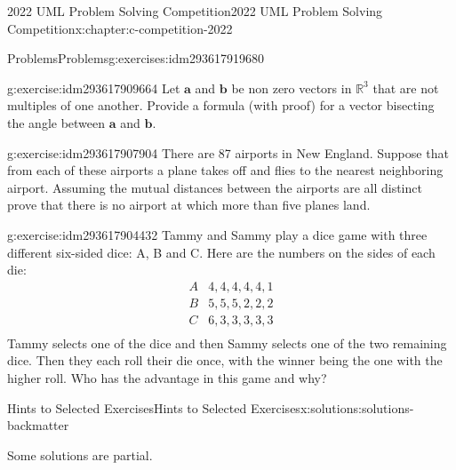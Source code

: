 \documentclass[twoside,10pt,]{book}
\numberwithin{equation}{section}
\providecommand\phantomsection{}
\newcommand{\RR}{\mathbb{R}}
\renewcommand{\vec}[1]{\mathbf{#1}}
\begin{document}
\begin{chapterptx}{2022 UML Problem Solving Competition}{}{2022 UML Problem Solving Competition}{}{}{x:chapter:c-competition-2022}
\begin{exercises-section}{Problems}{}{Problems}{}{}{g:exercises:idm293617919680}
\begin{divisionexercise}{4}{}{}{g:exercise:idm293617909664}
Let \(\vec{a}\) and  \(\vec{b}\)  be non zero vectors in \(\RR^3\) that are not multiples of one another. Provide a formula (with proof) for a vector bisecting the angle between \(\vec{a}\) and \(\vec{b}\).%
\end{divisionexercise}%
\begin{divisionexercise}{5}{}{}{g:exercise:idm293617907904}%
There are 87 airports in New England. Suppose that from each of these airports a plane takes off and flies to the nearest neighboring airport. Assuming the mutual distances between the airports are all distinct prove that there is no airport at which more than five planes land.%
\end{divisionexercise}%
\begin{divisionexercise}{6}{}{}{g:exercise:idm293617904432}%
Tammy and Sammy play a dice game with three different six-sided dice: A, B and C. Here are the numbers on the sides of each die:%
\begin{equation*}
\begin{array}{cc}
A & 4, 4, 4, 4, 4, 1 \\
B & 5, 5, 5, 2, 2, 2 \\
C & 6, 3, 3, 3, 3, 3 \\
\end{array}
\end{equation*}
Tammy selects one of the dice and then Sammy selects one of the two remaining dice.  Then they each roll their die once, with the winner being the one with the higher roll.   Who has the advantage in this game and why?%
\end{divisionexercise}%
\end{exercises-section}
\end{chapterptx}
%
\appendix%
%
\clearpage\phantomsection%
%
%
%
\typeout{************************************************}
\typeout{************************************************}
%
\begin{solutions-chapter}{Hints  to Selected Exercises}{}{Hints  to Selected Exercises}{}{}{x:solutions:solutions-backmatter}
\begin{introduction}{}%
Some solutions are partial.%
\end{introduction}%
\end{solutions-chapter}
%
%
\typeout{************************************************}
\typeout{************************************************}
%
\end{document}
